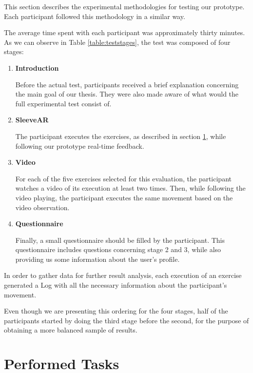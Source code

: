This section describes the experimental methodologies for testing our prototype. Each participant followed this methodology in a similar way.

The average time spent with each participant was approximately thirty minutes. As we can observe in Table \ref{table:teststages}, the test was composed of four stages:

\begin{enumerate}
\item \textbf{Introduction}

Before the actual test, participants received a brief explanation concerning the main goal of our thesis. They were also made aware of what would the full experimental test consist of.

\item \textbf{SleeveAR}

The participant executes the exercises, as described in section \ref{evaluation-tasks}, while following our prototype real-time feedback.

\item \textbf{Video}

For each of the five exercises selected for this evaluation, the participant  watches a video of its execution at least two times. Then, while following the video playing, the participant executes the same movement based on the video observation.

\item \textbf{Questionnaire}

Finally, a small questionnaire should be filled by the participant. This questionnaire includes questions concerning stage 2 and 3, while also providing us some information about the user's profile.


\end{enumerate}

In order to gather data for further result analysis, each execution of an exercise generated a Log with all the necessary information about the participant's movement. 

Even though we are presenting this ordering for the four stages, half of the participants started by doing the third stage before the second, for the purpose of obtaining a more balanced sample of results.

\section{Performed Tasks} \label{evaluation-tasks}


